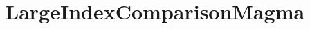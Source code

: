 \documentclass{test}
\begin{document}
\title{LargeIndexComparisonMagma} \maketitle \noindent






\end{document}
